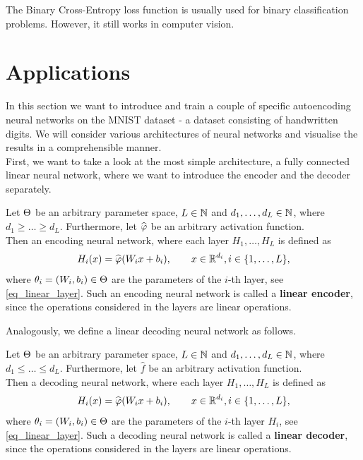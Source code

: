 \begin{remark}
The Binary Cross-Entropy loss function is usually used for binary classification problems. However, it still works in computer vision.
\end{remark}


\section{Applications}

In this section we want to introduce and train a couple of specific autoencoding neural networks on the MNIST dataset - a dataset consisting of handwritten digits. We will consider various architectures of neural networks and visualise the results in a comprehensible manner.\\
First, we want to take a look at the most simple architecture, a fully connected linear neural network, where we want to introduce the encoder and the decoder separately.

\begin{definition}\label{def:linear_encoder}
Let $\operatorname{\Theta}$ be an arbitrary parameter space, $L\in \operatorname{\mathbb{N}}$ and $d_1,\ldots,d_L \in \operatorname{\mathbb{N}}$, where $d_1\geq \ldots \geq d_L$. Furthermore, let $\widehat{\operatorname{\varphi}}$ be an arbitrary activation function.\\
Then an encoding neural network, where each layer $H_1,\ldots, H_L$ is defined as
\begin{align*}
H_i(x) = \widehat{\operatorname{\varphi}}(W_ix + b_i), \qquad x \in \operatorname{\mathbb{R}}^{d_i}, i \in \{1,\ldots, L\},
\end{align*}
where $\theta_i = (W_i, b_i)\in\operatorname{\Theta}$ are the parameters of the $i$-th layer, see \eqref{eq_linear_layer}. Such an encoding neural network is called a \textbf{linear encoder}, since the operations considered in the layers are linear operations.
\end{definition}

Analogously, we define a linear decoding neural network as follows.

\begin{definition}\label{def:linear_decoder}
Let $\operatorname{\Theta}$ be an arbitrary parameter space, $L\in \operatorname{\mathbb{N}}$ and $d_1,\ldots,d_L \in \operatorname{\mathbb{N}}$, where $d_1\leq \ldots \leq d_L$. Furthermore, let $\hat{f}$ be an arbitrary activation function.\\
Then a decoding neural network, where each layer $H_1,\ldots, H_L$ is defined as
\begin{align*}
H_i(x) = \widehat{\operatorname{\varphi}}(W_ix + b_i), \qquad x \in \operatorname{\mathbb{R}}^{d_i}, i \in \{1,\ldots, L\},
\end{align*}
where $\theta_i=(W_i, b_i)\in\operatorname{\Theta}$ are the parameters of the $i$-th layer $H_i$, see \eqref{eq_linear_layer}. Such a decoding neural network is called a \textbf{linear decoder}, since the operations considered in the layers are linear operations.
\end{definition}

